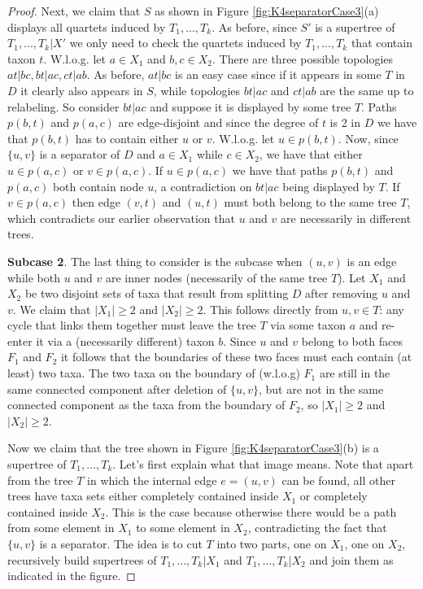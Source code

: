 \begin{proof}
Next, we claim that $S$ as shown in Figure \ref{fig:K4separatorCase3}(a) displays all quartets induced by $T_1,...,T_k$. As before, since $S'$ is a supertree of $T_1,...,T_k|X'$ we only need to check the quartets induced by $T_1,...,T_k$ that contain taxon $t$. W.l.o.g. let $a \in X_1$ and $b,c \in X_2$. There are three possible topologies $at|bc, bt|ac, ct|ab$. As before, $at|bc$ is an easy case since if it appears in some $T$ in $D$ it clearly also appears in $S$, while topologies $bt|ac$ and $ct|ab$ are the same up to relabeling. So consider $bt|ac$ and suppose it is displayed by some tree $T$. Paths $p(b,t)$ and $p(a,c)$ are edge-disjoint and since the degree of $t$ is 2 in $D$ we have that $p(b,t)$ has to contain either $u$ or $v$. W.l.o.g. let $u \in p(b,t)$. Now, since $\{u,v\}$ is a separator of $D$ and $a \in X_1$ while $c \in X_2$, we have that either $u \in p(a,c)$ or $v \in p(a,c)$. If $u \in p(a,c)$ we have that paths $p(b,t)$ and $p(a,c)$ both contain node $u$, a contradiction on $bt|ac$ being displayed by $T$. If $v \in p(a,c)$ then edge $(v,t)$ and $(u,t)$ must both belong to the same tree $T$, which contradicts our earlier observation that $u$ and $v$ are necessarily in different trees.


\textbf{Subcase 2}. The last thing to consider is the subcase when $(u,v)$ is an edge while both $u$ and $v$ are inner nodes (necessarily of the same tree $T$). Let $X_1$ and $X_2$ be two disjoint sets of taxa that result from splitting $D$ after removing $u$ and $v$. We claim that $|X_1| \geq 2$ and $|X_2| \geq 2$. This follows directly from $u,v \in T$: any cycle that links them together must leave the tree $T$ via some taxon $a$ and re-enter it via a (necessarily different) taxon $b$. Since $u$ and $v$ belong to both faces $F_1$ and $F_2$ it follows that the boundaries of these two faces must each contain (at least) two taxa. The two taxa on the boundary of (w.l.o.g) $F_1$ are still in the same connected component after deletion of $\{u,v\}$, but are not in
the same connected component as the taxa from the boundary of $F_2$, so $|X_1| \geq 2$ and $|X_2| \geq 2$.

Now we claim that the tree shown in Figure \ref{fig:K4separatorCase3}(b) is a supertree of $T_1,...,T_k$. Let's first explain what that image means. Note that apart from the tree $T$ in which the internal edge $e=(u,v)$ can be found, all other trees have taxa sets either completely contained inside $X_1$ or completely contained inside $X_2$. This is the case because otherwise there would be a path from some element in $X_1$ to some element in $X_2$, contradicting the fact that $\{u,v\}$ is a separator. The idea is to cut $T$ into two parts, one on $X_1$, one on $X_2$, recursively build supertrees of $T_1,...,T_k|X_1$ and $T_1,...,T_k|X_2$ and join them as indicated in the figure.


\end{proof}
